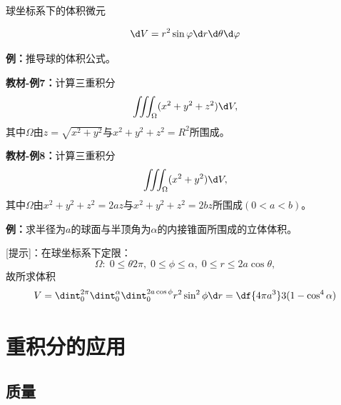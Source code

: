 球坐标系下的体积微元

\begin{center}
\end{center}

$$\d V=r^2\sin\varphi \d r\d\theta \d\varphi$$

{\bf 例：}推导球的体积公式。

{\bf 教材-例7：}计算三重积分
$$\iiint_{\Omega}(x^2+y^2+z^2)\d V,$$
其中$\Omega$由$z=\sqrt{x^2+y^2}$与$x^2+y^2+z^2=R^2$所围成。

{\bf 教材-例8：}计算三重积分
$$\iiint_{\Omega}(x^2+y^2)\d V,$$
其中$\Omega$由$x^2+y^2+z^2=2az$与$x^2+y^2+z^2=2bz$所围成$(0<a<b)$。

{\bf 例：}求半径为$a$的球面与半顶角为$\alpha$的内接锥面所围成的立体体积。

[提示]：在球坐标系下定限：
$$\Omega:\;0\leq\theta2\pi,\;0\leq\phi\leq\alpha,\;0\leq r\leq2a\cos\theta,$$
故所求体积
$$V=\dint_0^{2\pi}\dint_0^{\alpha}\dint_0^{2a\cos\phi}r^2\sin^2\phi\d r
=\df{4\pi a^3}3(1-\cos^4\alpha)$$

\section{重积分的应用}

\subsection{质量}

